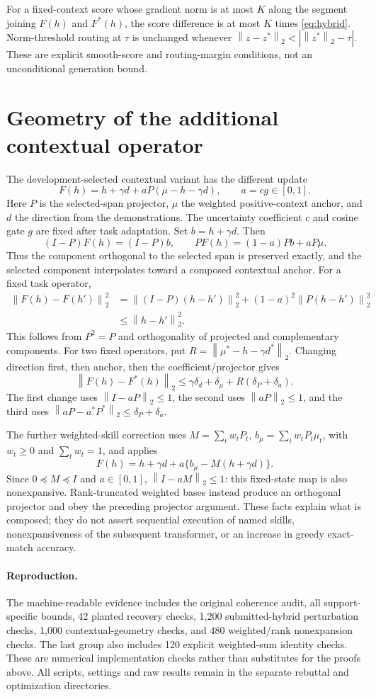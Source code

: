 \documentclass[11pt]{article}
\newcommand{\norm}[1]{\left\lVert#1\right\rVert}
\begin{document}
For a fixed-context score whose gradient norm is at most $K$ along the segment
joining $F(h)$ and $F^*(h)$, the score difference is at most $K$ times
\eqref{eq:hybrid}. Norm-threshold routing at $\tau$ is unchanged whenever
$\norm{z-z^*}_2<|\norm{z^*}_2-\tau|$. These are explicit smooth-score and
routing-margin conditions, not an unconditional generation bound.

\section{Geometry of the additional contextual operator}

The development-selected contextual variant has the different update
\[
 F(h)=h+\gamma d+aP(\mu-h-\gamma d),\qquad a=cg\in[0,1].
\]
Here $P$ is the selected-span projector, $\mu$ the weighted positive-context
anchor, and $d$ the direction from the demonstrations. The uncertainty coefficient
$c$ and cosine gate $g$ are fixed after task adaptation. Set $b=h+\gamma d$. Then
\[
 (I-P)F(h)=(I-P)b,\qquad PF(h)=(1-a)Pb+aP\mu.
\]
Thus the component orthogonal to the selected span is preserved exactly, and
the selected component interpolates toward a composed contextual anchor.
For a fixed task operator,
\begin{align*}
 \norm{F(h)-F(h')}_2^2
 &=\norm{(I-P)(h-h')}_2^2+(1-a)^2\norm{P(h-h')}_2^2\\
 &\leq\norm{h-h'}_2^2.
\end{align*}
This follows from $P^2=P$ and orthogonality of projected and complementary
components. For two fixed operators, put
$R=\norm{\mu^*-h-\gamma d^*}_2$. Changing direction first, then anchor,
then the coefficient/projector gives
\[
 \norm{F(h)-F^*(h)}_2\leq
 \gamma\delta_d+\delta_\mu+R(\delta_P+\delta_a).
\]
The first change uses $\norm{I-aP}_2\leq1$, the second uses
$\norm{aP}_2\leq1$, and the third uses
$\norm{aP-a^*P^*}_2\leq\delta_P+\delta_a$.

The further weighted-skill correction uses
$M=\sum_t w_tP_t$, $b_\mu=\sum_t w_tP_t\mu_t$, with $w_t\geq0$ and
$\sum_tw_t=1$, and applies
\[
 F(h)=h+\gamma d+a\{b_\mu-M(h+\gamma d)\}.
\]
Since $0\preceq M\preceq I$ and $a\in[0,1]$,
$\norm{I-aM}_2\leq1$: this fixed-state map is also nonexpansive.
Rank-truncated weighted bases instead produce an orthogonal projector and
obey the preceding projector argument. These facts explain what is composed;
they do not assert sequential execution of named skills, nonexpansiveness of
the subsequent transformer, or an increase in greedy exact-match accuracy.

\paragraph{Reproduction.}
The machine-readable evidence includes the original coherence audit, all
support-specific bounds, 42 planted recovery checks, 1,200 submitted-hybrid
perturbation checks, 1,000 contextual-geometry checks, and 480 weighted/rank
nonexpansion checks. The last group also includes 120 explicit weighted-sum
identity checks. These are numerical implementation checks rather than substitutes
for the proofs above. All scripts, settings and raw results remain in the
separate rebuttal and optimization directories.
\end{document}
